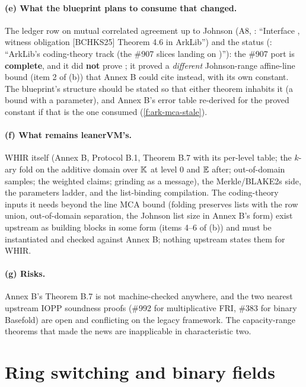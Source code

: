 \paragraph{(e) What the blueprint plans to consume that changed.}
The ledger row on mutual correlated agreement up to Johnson (A8, : ``Interface
, witness obligation [BCHKS25] Theorem 4.6 in ArkLib'') and the status
(: ``ArkLib's coding-theory track (the \#907 slices landing on )''):
the \#907 port is \textbf{complete}, and it did \textbf{not} prove
; it proved a \emph{different} Johnson-range affine-line
bound (item 2 of (b)) that Annex B could cite instead, with its own constant. The blueprint's
 structure should be stated so that either theorem inhabits it (a bound
 with  a parameter), and
Annex B's error table re-derived for the proved constant if that is the one consumed
(\cref{f:ark-mca-stale}).

\paragraph{(f) What remains leanerVM's.}
WHIR itself (Annex B, Protocol B.1, Theorem B.7 with its per-level table; the $k$-ary fold on
the additive domain over $\mathbb{K}$ at level 0 and $\mathbb{E}$ after; out-of-domain samples; the weighted
claims; grinding as a message), the Merkle/BLAKE2s side, the parameters ladder, and the
list-binding compilation. The coding-theory inputs it needs beyond the line MCA bound (folding
preserves lists with the row union, out-of-domain separation, the Johnson list size in Annex B's
form) exist upstream as building blocks in some form (items 4--6 of (b)) and must be instantiated
and checked against Annex B; nothing upstream states them for WHIR.

\paragraph{(g) Risks.}
Annex B's Theorem B.7 is not machine-checked anywhere, and the two nearest upstream IOPP
soundness proofs (\#992 for multiplicative FRI, \#383 for binary Basefold) are open and
conflicting on the legacy framework. The capacity-range theorems that made the news are
inapplicable in characteristic two.

\section{Ring switching and binary fields}\label{sec:ark-ring}


